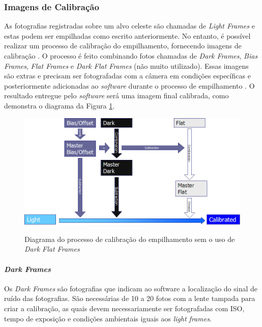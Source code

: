 \subsubsection{Imagens de Calibração}

As fotografias registradas sobre um alvo celeste são chamadas de \textit{Light Frames} e estas podem ser empilhadas como escrito anteriormente. No entanto, é possível realizar um processo de calibração do empilhamento, fornecendo imagens de calibração \cite{man:deepskystackerfaq}.
O processo é feito combinando fotos chamadas de \textit{Dark Frames},\textit{ Bias Frames}, \textit{Flat Frames} e \textit{Dark Flat Frames} (não muito utilizado). Essas imagens são extras e precisam ser fotografadas com a câmera em condições específicas e posteriormente adicionadas ao \textit{software} durante o processo de empilhamento 
\cite{man:deepskystackerBetterImages}. O resultado entregue pelo \textit{software} será uma imagem final calibrada, como demonstra o diagrama da Figura \ref{fig:calibrationDeepSkyStacker}.


\begin{figure}[!htb]
	\centering
	\caption{Diagrama do processo de calibração do empilhamento sem o uso de \textit{Dark Flat Frames}}
	\includegraphics[width=0.7\linewidth]{figuras/Calibration_Alternate1}
	\label{fig:calibrationDeepSkyStacker}
\end{figure}


\paragraph{\textit{Dark Frames}}

Os \textit{Dark Frames} são fotografias que indicam ao software a localização do sinal de ruído das fotografias. São necessárias de 10 a 20 fotos com a lente tampada para criar a calibração, as quais devem necessariamente ser fotografadas com ISO, tempo de exposição e condições ambientais iguais aos \textit{light frames}.\cite{man:deepskystackerfaq}

